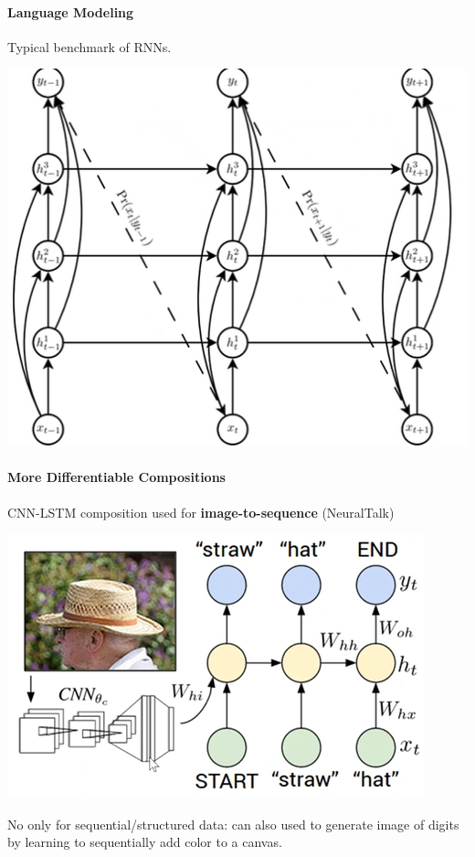 \documentclass[10pt]{report}
\begin{document}
\paragraph{Language Modeling} Typical benchmark of RNNs.
\begin{center}
	\includegraphics[scale=0.5]{100.png}
\end{center}

\paragraph{More Differentiable Compositions} CNN-LSTM composition used for \textbf{image-to-sequence} (NeuralTalk)\begin{center}
	\includegraphics[scale=0.5]{104.png}
\end{center}
No only for sequential/structured data: can also used to generate image of digits by learning to sequentially add color to a canvas.
\end{document}
